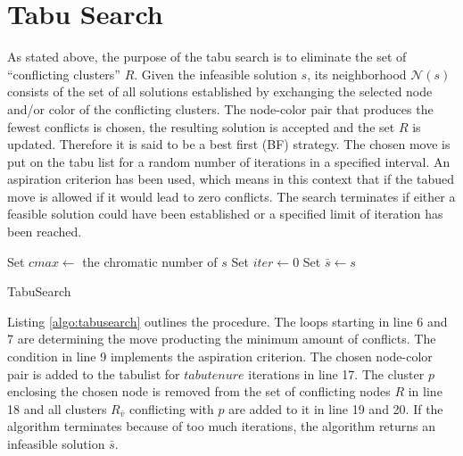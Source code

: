 \section{Tabu Search}
\label{sec:tabu}
As stated above, the purpose of the tabu search is to eliminate the set of ``conflicting clusters'' $R$. Given the infeasible solution $s$, its neighborhood $\mathcal{N}(s)$ consists of the set of all solutions established by exchanging the selected node and/or color of the conflicting clusters. The node-color pair that produces the fewest conflicts is chosen, the resulting solution is accepted and the set $R$ is updated. Therefore it is said to be a best first (BF) strategy. The chosen move is put on the tabu list for a random number of iterations in a specified interval. An aspiration criterion has been used, which means in this context that if the tabued move is allowed if it would lead to zero conflicts. The search terminates if either a feasible solution could have been established or a specified limit of iteration has been reached.

\begin{algorithm}[h]
Set $cmax \gets$ the chromatic number of $s$\;
Set $iter \gets 0$\;
Set $\bar{s} \gets s$\;
\;
\caption{TabuSearch}
\label{algo:tabusearch}
\end{algorithm}

Listing \ref{algo:tabusearch} outlines the procedure. The loops starting in line 6 and 7 are determining the move producting the minimum amount of conflicts. The condition in line 9 implements the aspiration criterion. The chosen node-color pair is added to the tabulist for $\mathit{tabutenure}$ iterations in line 17. The cluster $p$ enclosing the chosen node is removed from the set of conflicting nodes $R$ in line 18 and all clusters $R_{\bar{v}}$ conflicting with $p$ are added to it in line 19 and 20. If the algorithm terminates because of too much iterations, the algorithm returns an infeasible solution $\bar{s}$.


